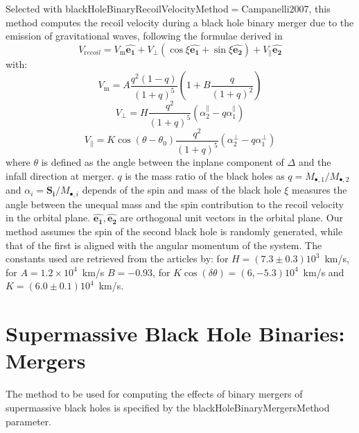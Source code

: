 Selected with {\normalfont \ttfamily blackHoleBinaryRecoilVelocityMethod}$=${\normalfont \ttfamily Campanelli2007}, this method computes the recoil velocity during a black hole binary merger due to the emission of gravitational waves, following the formulae derived in \cite {campanelli_large_2007}
\begin{equation}
V_{\mathrm recoil}=V_{\mathrm m}\mathbf{\hat{e_1}}+V_\perp(\cos\xi\mathbf{\hat{e_1}}+\sin\xi\mathbf{\hat{e_2}})+V_\parallel\mathbf{\hat{e_2}} 
\end{equation}
with:
\begin{equation}
V_{\mathrm m}=A\frac{q^2(1-q)}{(1+q)^5}(1+B\frac{q}{(1+q)^2})
\end{equation}
\begin{equation}
V_\perp=H\frac{q^2}{(1+q)^5}(\alpha^\parallel_2-q\alpha^\parallel_1)
\end{equation}
\begin{equation}
V_\parallel=K\cos(\theta-\theta_0)\frac{q^2}{(1+q)^5}(\alpha^\perp_2-q\alpha^\perp_1)
\end{equation}
where $\theta$ is defined as the angle between the inplane \gls{component} of $\Delta$ and the infall direction at merger. $q$ is the mass ratio of the black holes as $q=M_{\bullet,1}/M_{\bullet,2}$ and $\alpha_i=\mathbf{S_i}/M_{\bullet,i}$ depends of the spin and mass of the black hole $\xi$ measures the angle between the unequal mass and the spin contribution to the recoil velocity in the orbital plane. $\mathbf{\hat{e_1}} , \mathbf{\hat{e_2}}$ are orthogonal unit vectors in the orbital plane. Our method assumes the spin of the second black hole is randomly generated, while that of the first is aligned with the angular momentum of the system. The constants used are retrieved from the articles by: \cite{koppitz_recoil_2007} for $H=(7.3\pm 0.3)10^3$~km/s, \cite{gonzalez_maximum_2007} for $A=1.2 \times 10^4$~km/s $B=-0.93$, \cite{gonzalez_supermassive_2007} for $K\cos(\delta\theta)=(6,-5.3)10^4$~km/s and $K=(6.0\pm 0.1)10^4$~km/s.

\section{Supermassive Black Hole Binaries: Mergers}

The method to be used for computing the effects of binary mergers of supermassive black holes is specified by the {\normalfont \ttfamily blackHoleBinaryMergersMethod} parameter.

